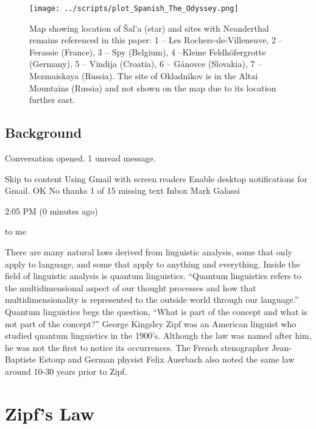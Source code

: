 \documentclass[a4paper,10pt]{article}
\begin{document}
\begin{figure}
	\centering
	\texttt{[image: ../scripts/plot\_Spanish\_The\_Odyssey.png]}
	\caption{Map showing location of Šal’a (star) and sites with Neanderthal remains referenced in this paper: 1 -- Les Rochers-de-Villeneuve, 2 -- Ferassie (France), 3 -- Spy (Belgium), 4 --Kleine Feldhöfergrotte (Germany), 5 -- Vindija (Croatia), 6 -- Gánovce (Slovakia), 7 -- Mezmaiskaya (Russia). The site of Okladnikov is in the Altai Mountains (Russia) and not shown on the map due to its location further east.}
	\label{fig:map}
\end{figure}


\subsection{Background}



Conversation opened. 1 unread message.

Skip to content
Using Gmail with screen readers
Enable desktop notifications for Gmail.   OK  No thanks
1 of 15
missing text
Inbox
Mark Galassi
	
2:05 PM (0 minutes ago)
	
to me

There are many natural laws derived from linguistic analysis, some that only apply to language, and some that apply to anything and everything. Inside the field of linguistic analysis is quantum linguistics. “Quantum linguistics refers to the multidimensional aspect of our thought processes and how that multidimensionality is represented to the outside world through our language.” Quantum linguistics begs the question, “What is part of the concept and what is not part of the concept?” George Kingsley Zipf was an American linguist who studied quantum linguistics in the 1900’s. Although the law was named after him, he was not the first to notice its occurrences. The French stenographer Jean-Baptiste Estoup and German physist Felix Auerbach also noted the same law around 10-30 years prior to Zipf.   




\section{Zipf's Law}
\end{document}
